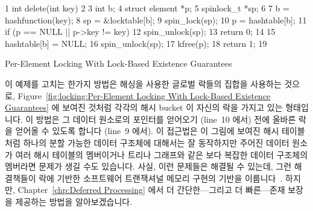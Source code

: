 \begin{listing}[tbp]
{ \scriptsize
\begin{verbbox}
  1 int delete(int key)
  2 {
  3   int b;
  4   struct element *p;
  5   spinlock_t *sp;
  6
  7   b = hashfunction(key);
  8   sp = &locktable[b];
  9   spin_lock(sp);
 10   p = hashtable[b];
 11   if (p == NULL || p->key != key) {
 12     spin_unlock(sp);
 13     return 0;
 14   }
 15   hashtable[b] = NULL;
 16   spin_unlock(sp);
 17   kfree(p);
 18   return 1;
 19 }
\end{verbbox}
}
\centering
\theverbbox
\caption{Per-Element Locking With Lock-Based Existence Guarantees}
\label{lst:locking:Per-Element Locking With Lock-Based Existence Guarantees}
\end{listing}

이 예제를 고치는 한가지 방법은 해싱을 사용한 글로벌 락들의 집합을 사용하는
것으로,
Figure~\ref{fig:locking:Per-Element Locking With Lock-Based Existence Guarantees}
에 보여진 것처럼 각각의 해시 bucket 이 자신의 락을 가지고 있는 형태입니다.
이 방법은 그 데이터 원소로의 포인터를 얻어오기 (line~10 에서) 전에 올바른 락을
얻어올 수 있도록 합니다 (line~9 에서).
이 접근법은 이 그림에 보여진 해시 테이블처럼 하나의 분할 가능한 데이터 구조체에
대해서는 잘 동작하지만 주어진 데이터 원소가 여러 해시 테이블의 멤버이거나
트리나 그래프와 같은 보다 복잡한 데이터 구조체의 멤버라면 문제가 생길 수도
있습니다.
사실, 이런 문제들은 해결될 수 있는데, 그런 해결책들이 락에 기반한 소프트웨어
트랜잭셔널 메모리 구현의 기반을 이룹니다~\cite{Shavit95,DaveDice2006DISC}.
하지만, Chapter~\ref{chp:Deferred Processing} 에서 더 간단한---그리고 더
빠른---존재 보장을 제공하는 방법을 알아보겠습니다.
\iffalse

One way to fix this example is to use a hashed set of global locks, so
that each hash bucket has its own lock, as shown in
Listing~\ref{lst:locking:Per-Element Locking With Lock-Based Existence Guarantees}.
This approach allows acquiring the proper lock (on line~9) before
gaining a pointer to the data element (on line~10).
Although this approach works quite well for elements contained in a
single partitionable data structure such as the hash table shown in the
figure, it can be problematic if a given data element can be a member
of multiple hash tables or given more-complex data structures such
as trees or graphs.
These problems can be solved, in fact, such solutions form the basis
of lock-based software transactional memory
implementations~\cite{Shavit95,DaveDice2006DISC}.
However,
Chapter~\ref{chp:Deferred Processing}
describes simpler---and faster---ways of providing existence guarantees.
\fi
